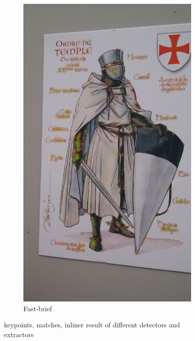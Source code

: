 \documentclass[10pt,conference,compsocconf]{IEEEtran}
\begin{document}
\begin{figure}[!ht]
        ~ %
        \begin{subfigure}[b]{0.15\textwidth}
                \includegraphics[width=\textwidth]{f}
                \caption{Fast-brief}
                \label{fig:f}
        \end{subfigure}
        \caption{keypoints, matches, inliner result of different detectors and extractors}\label{fig:animals}
\end{figure}
\end{document}

